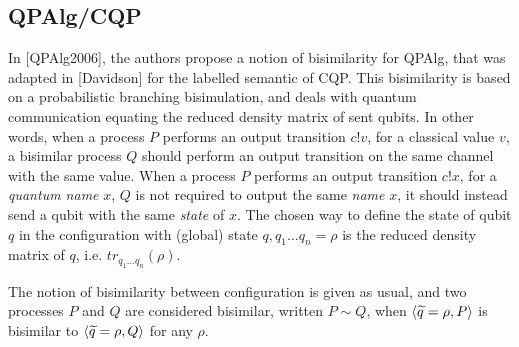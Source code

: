 \subsection{QPAlg/CQP}

In [QPAlg2006], the authors propose a notion of bisimilarity for QPAlg, that was adapted in [Davidson] for the labelled semantic of CQP. This bisimilarity is based on a probabilistic branching bisimulation, and deals with quantum communication equating the reduced density matrix of sent qubits. In other words, when a process $P$ performs an output transition $c!v$, for a classical value $v$, a bisimilar process $Q$ should perform an output transition on the same channel with the same value. When a process $P$ performs an output transition $c!x$, for a \textit{quantum name} $x$, $Q$ is not required to output the same \textit{name} $x$, it should instead send a qubit with the same \textit{state} of $x$. The chosen way to define the state of qubit $q$ in the configuration with (global) state $q, q_1 \ldots q_n = \rho$ is the reduced density matrix of $q$, i.e. $tr_{q_1 \ldots q_n}(\rho)$.


The notion of bisimilarity between configuration is given as usual, and two processes $P$ and $Q$ are considered bisimilar, written $P \sim Q$, when $\langle\widetilde{q} = \rho, P\rangle$ is bisimilar to $\langle\widetilde{q} = \rho, Q\rangle$ for any $\rho$.


